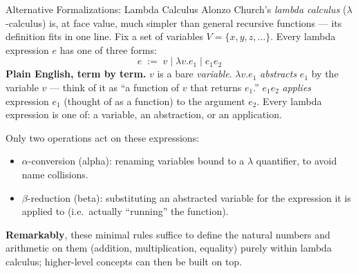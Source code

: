 \documentclass[aspectratio=169,10pt]{beamer}
\begin{document}
\begin{frame}{Alternative Formalizations: Lambda Calculus}
  Alonzo Church's \emph{lambda calculus} ($\lambda$-calculus) is, at face
  value, much simpler than general recursive functions --- its definition fits
  in one line. Fix a set of variables $V = \{x, y, z, \dots\}$. Every lambda
  expression $e$ has one of three forms:
  \[
    e \; := \; v \mid \lambda v.e_1 \mid e_1 e_2
  \]
  \textbf{Plain English, term by term.} $v$ is a bare \emph{variable}.
  $\lambda v.e_1$ \emph{abstracts} $e_1$ by the variable $v$ --- think of it as
  ``a function of $v$ that returns $e_1$.'' $e_1 e_2$ \emph{applies} expression
  $e_1$ (thought of as a function) to the argument $e_2$. Every lambda
  expression is one of: a variable, an abstraction, or an application.

  \vspace{2mm}
  Only two operations act on these expressions:
  \begin{itemize}
    \item $\alpha$-conversion (alpha): renaming variables bound to a $\lambda$
      quantifier, to avoid name collisions.
    \item $\beta$-reduction (beta): substituting an abstracted variable for the
      expression it is applied to (i.e.\ actually ``running'' the function).
  \end{itemize}
  \textbf{Remarkably}, these minimal rules suffice to define the natural
  numbers and arithmetic on them (addition, multiplication, equality) purely
  within lambda calculus; higher-level concepts can then be built on top.
\end{frame}
\end{document}
